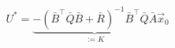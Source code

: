 \documentclass{article}
\begin{document}
\thispagestyle{empty}
$$
U^* = \underbrace{-(\bar{B}^\top\bar{Q}\bar{B} + \bar{R})^{-1}\bar{B}^\top\bar{Q}\bar{A}}_{:=K}\vec{x}_0
$$
\end{document}
